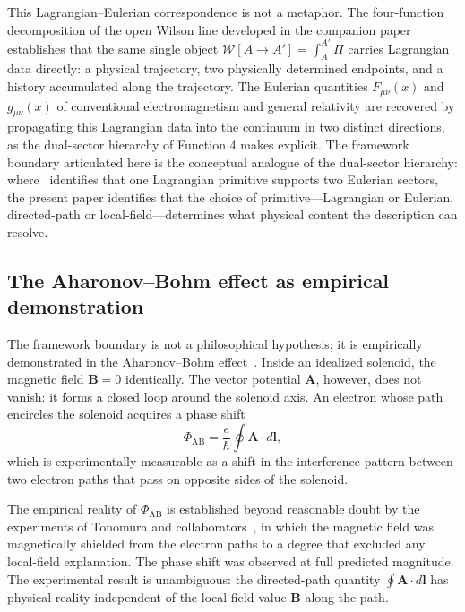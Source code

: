 \documentclass[%
 reprint, amsmath,amssymb, aps, prb, ]{revtex4-2}
\numberwithin{equation}{section}
\newcommand{\WL}{\mathcal{W}}
\begin{document}
This Lagrangian--Eulerian correspondence is not a metaphor. The four-function decomposition of the open Wilson line developed in the companion paper~\cite{hanamura55} establishes that the same single object $\WL[A\to A'] = \int_A^{A'}\Pi$ carries Lagrangian data directly: a physical trajectory, two physically determined endpoints, and a history accumulated along the trajectory. The Eulerian quantities $F_{\mu\nu}(x)$ and $g_{\mu\nu}(x)$ of conventional electromagnetism and general relativity are recovered by propagating this Lagrangian data into the continuum in two distinct directions, as the dual-sector hierarchy of Function 4 makes explicit. The framework boundary articulated here is the conceptual analogue of the dual-sector hierarchy: where~\cite{hanamura55} identifies that one Lagrangian primitive supports two Eulerian sectors, the present paper identifies that the choice of primitive---Lagrangian or Eulerian, directed-path or local-field---determines what physical content the description can resolve.

\subsection{The Aharonov--Bohm effect as empirical demonstration}
\label{sec:aharonov_bohm}

The framework boundary is not a philosophical hypothesis; it is empirically demonstrated in the Aharonov--Bohm effect~\cite{Aharonov1959, Tonomura1986}. Inside an idealized solenoid, the magnetic field $\mathbf{B}=0$ identically. The vector potential $\mathbf{A}$, however, does not vanish: it forms a closed loop around the solenoid axis. An electron whose path encircles the solenoid acquires a phase shift
\begin{equation}
\Phi_{\mathrm{AB}} = \frac{e}{\hbar}\oint \mathbf{A}\cdot d\mathbf{l},
\label{eq:aharonov_bohm}
\end{equation}
which is experimentally measurable as a shift in the interference pattern between two electron paths that pass on opposite sides of the solenoid.

The empirical reality of $\Phi_{\mathrm{AB}}$ is established beyond reasonable doubt by the experiments of Tonomura and collaborators~\cite{Tonomura1986}, in which the magnetic field was magnetically shielded from the electron paths to a degree that excluded any local-field explanation. The phase shift was observed at full predicted magnitude. The experimental result is unambiguous: the directed-path quantity $\oint\mathbf{A}\cdot d\mathbf{l}$ has physical reality independent of the local field value $\mathbf{B}$ along the path.
\end{document}
